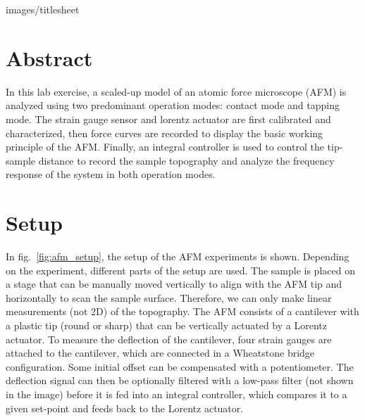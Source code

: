 \documentclass[a4paper,twoside,11pt,DIV=13,BCOR=5mm,numbers=noenddot]{scrbook}
\begin{document}
\renewcommand{\baselinestretch}{1.25}

\large

{images/titlesheet}     %


\chapter{Abstract}

In this lab exercise, a scaled-up model of an atomic force microscope (AFM) is analyzed using two predominant operation modes: contact mode and tapping mode.
The strain gauge sensor and lorentz actuator are first calibrated and characterized, then force curves are recorded to display the basic working principle of the AFM.
Finally, an integral controller is used to control the tip-sample distance to record the sample topography and analyze the frequency response of the system in both operation modes.

\chapter{Setup}


In fig.~\ref{fig:afm_setup}, the setup of the AFM experiments is shown. Depending on the experiment, different parts of the setup are used.
The sample is placed on a stage that can be manually moved vertically to align with the AFM tip and horizontally to scan the sample surface.
Therefore, we can only make linear measurements (not 2D) of the topography.
The AFM consists of a cantilever with a plastic tip (round or sharp) that can be vertically actuated by a Lorentz actuator.
To measure the deflection of the cantilever, four strain gauges are attached to the cantilever, which are connected in a Wheatstone bridge configuration.
Some initial offset can be compensated with a potentiometer.
The deflection signal can then be optionally filtered with a low-pass filter (not shown in the image) before it is fed into an integral controller, which
compares it to a given set-point and feeds back to the Lorentz actuator.
\end{document}
